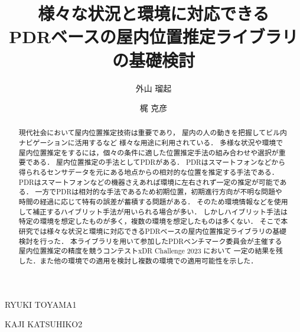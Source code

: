 \documentclass[Japanese]{dicomopapers}
\begin{document}
\title{様々な状況と環境に対応できる\\PDRベースの屋内位置推定ライブラリの基礎検討}



\author{外山 瑠起}{RYUKI TOYAMA}{1}
\author{梶 克彦}{KAJI KATSUHIKO}{2}



\begin{abstract}
	現代社会において屋内位置推定技術は重要であり，
	屋内の人の動きを把握してビル内ナビゲーションに活用するなど
	様々な用途に利用されている．
	多様な状況や環境で屋内位置推定をするには，個々の条件に適した位置推定手法の組み合わせや選択が重要である．
	屋内位置推定の手法としてPDRがある．
	PDRはスマートフォンなどから得られるセンサデータを元にある地点からの相対的な位置を推定する手法である．
	PDRはスマートフォンなどの機器さえあれば環境に左右されず一定の推定が可能である．
	一方でPDRは相対的な手法であるため初期位置，初期進行方向が不明な問題や時間の経過に応じて特有の誤差が蓄積する問題がある．
	そのため環境情報などを使用して補正するハイブリット手法が用いられる場合が多い．
	しかしハイブリット手法は特定の環境を想定したものが多く，複数の環境を想定したものは多くない．
	そこで本研究では様々な状況と環境に対応できるPDRベースの屋内位置推定ライブラリの基礎検討を行った．
	本ライブラリを用いて参加したPDRベンチマーク委員会が主催する屋内位置推定の精度を競うコンテストxDR Challenge 2023 において
	一定の結果を残した．また他の環境での適用を検討し複数の環境での適用可能性を示した．
\end{abstract}

\maketitle




















\end{document}
